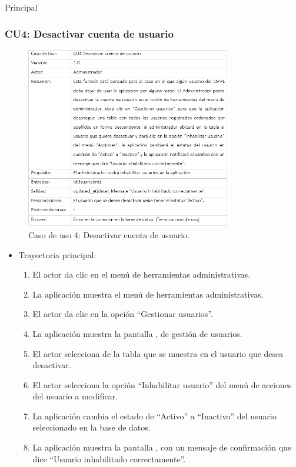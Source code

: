\begin{UCtrayectoria}{Principal}
\newpage
		
		\subsubsection{CU4: Desactivar cuenta de usuario}
			\begin{figure}[htbp!]
				\centering
					\includegraphics[width=0.8\textwidth]{images/CU/CU4}
					\caption{Caso de uso 4: Desactivar cuenta de usuario.}
				\label{Tabla}
			\end{figure}
			
			\begin{itemize}
				\item Trayectoria principal:
					\begin{enumerate}
						\item El actor da clic en el menú de herramientas administrativas.
						\item La aplicación muestra el menú de herramientas administrativas.
						\item El actor da clic en la opción ``Gestionar usuarios''.
						\item La aplicación muestra la pantalla , de gestión de usuarios.
						\item El actor selecciona de la tabla que se muestra en  el usuario que desea desactivar.
						\item El actor selecciona la opción ``Inhabilitar usuario'' del menú de acciones del usuario a modificar.
						\item La aplicación cambia el estado de ``Activo'' a ``Inactivo'' del usuario seleccionado en la base de datos.
						\item La aplicación muestra la pantalla , con un mensaje de confirmación que dice ``Usuario inhabilitado correctamente''.
					\end{enumerate}
			\end{itemize}
			

\end{UCtrayectoria}

